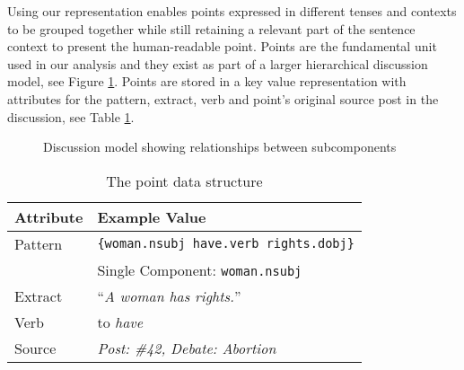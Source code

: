     Using our representation enables points expressed in different tenses and contexts to be grouped together while still retaining a relevant part of the sentence context to present the human-readable point. Points are the fundamental unit used in our analysis and they exist as part of a larger hierarchical discussion model, see Figure \ref{fig:discmod}. Points are stored in a key value representation with attributes for the pattern, extract, verb and point's original source post in the discussion, see Table \ref{tab:point-keyval}.

    \begin{figure}
      \centering
      \caption{Discussion model showing relationships between subcomponents}

      \label{fig:discmod}
    \end{figure}

    \begin{table}[]
      \centering
      \caption{The point data structure}
      \label{tab:point-keyval}
      \begin{tabular}{|l|l|}
        \hline
        \textbf{Attribute}       & \textbf{Example Value}                         \\ \hline
        Pattern                  & \texttt{\{woman.nsubj have.verb rights.dobj\}} \\
                                 & Single Component: \texttt{woman.nsubj}         \\ \hline
        Extract                  & ``\textit{A woman has rights.}''               \\ \hline
        Verb                     & to \textit{have}                               \\ \hline
        Source                   & \textit{Post: \#42, Debate: Abortion}          \\ \hline
      \end{tabular}
    \end{table}

